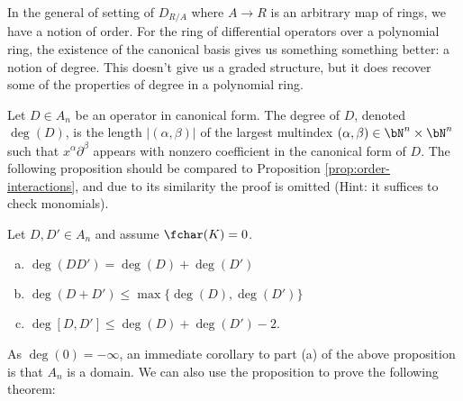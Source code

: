In the general of setting of $D_{R/A}$ where $A\to R$ is an arbitrary map of rings, we have a notion of order. For the ring of differential operators over a polynomial ring, the existence of the canonical basis gives us something something better: a notion of degree. This doesn't give us a graded structure, but it does recover some of the properties of degree in a polynomial ring. 

Let $D \in A_n$ be an operator in canonical form. The degree of $D$, denoted $\deg(D)$, is the length $|(\alpha,\beta)|$ of the largest multindex $(\alpha,\beta) \in \bN^n\times \bN^n$ such that $x^\alpha\partial^\beta$ appears with nonzero coefficient in the canonical form of $D$. The following proposition should be compared to Proposition \ref{prop:order-interactions}, and due to its similarity the proof is omitted (Hint: it suffices to check monomials).
\begin{prop}\label{prop:degree-properties}
    Let $D,D' \in A_n$ and assume $\fchar(K) = 0$.
	\begin{enumerate}[(a)]
		\item $\deg(DD') = \deg(D) + \deg(D')$
		\item $\deg(D+D') \leq \max\{\deg(D), \deg(D')\}$
		\item $\deg[D,D']\leq \deg(D) + \deg(D') - 2$.
	\end{enumerate}
\end{prop}
As $\deg(0) = -\infty$, an immediate corollary to part (a) of the above proposition is that $A_n$ is a domain. We can also use the proposition to prove the following theorem:

